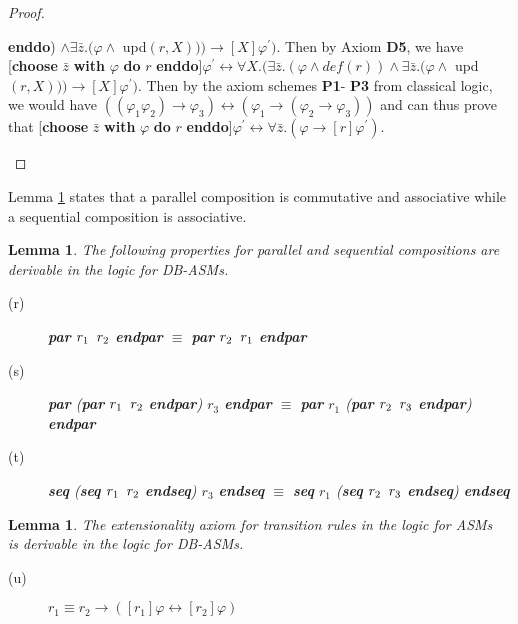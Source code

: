 \documentclass[preprint,11pt]{elsarticle}
\newtheorem{lemma}[theorem]{Lemma}
\theoremstyle{definition}
\theoremstyle{remark}
\begin{document}
\begin{proof}
\begin{itemize}
  \textbf{enddo}) $\wedge\exists \bar{z}.(\varphi\wedge$ upd$(r,X)))\rightarrow[X]\varphi^{\prime})$. Then by Axiom
  \textbf{D5}, we have [\textbf{choose} $\bar{z}$ \textbf{with} $\varphi$ \textbf{do} $r$
  \textbf{enddo}]$\varphi^{\prime}\leftrightarrow \forall X.(\exists \bar{z}.(\varphi\wedge def(r)) \wedge\exists \bar{z}.(\varphi\wedge$ upd$(r,X)))\rightarrow[X]\varphi^{\prime})$. Then by the axiom schemes \textbf{P1}- \textbf{P3} from classical logic, we would have $((\varphi_1\varphi_2)\rightarrow \varphi_3)\leftrightarrow (\varphi_1\rightarrow(\varphi_2\rightarrow\varphi_3))$ and can thus prove that [\textbf{choose} $\bar{z}$ \textbf{with} $\varphi$ \textbf{do} $r$
  \textbf{enddo}]$\varphi^{\prime}\leftrightarrow$$\forall \bar{z}. (\varphi\rightarrow [r]\varphi^{\prime})$.
\end{itemize}
\end{proof}
\fi
Lemma \ref{lem-soundness-composition} states that a parallel
composition is commutative and associative while a sequential
composition is associative.

\begin{lemma}\label{lem-soundness-composition}The following properties for parallel and sequential compositions are derivable in the logic for DB-ASMs.
\begin{description}
  \item[(r)] \textbf{par} $r_1\hspace{0.2cm} r_2$ \textbf{endpar} $\equiv$ \textbf{par} $r_2\hspace{0.2cm} r_1$ \textbf{endpar}\smallskip
  \item[(s)] \textbf{par} (\textbf{par} $r_1\hspace{0.2cm} r_2$ \textbf{endpar}) $r_3$ \textbf{endpar} $\equiv$ \textbf{par} $r_1$ (\textbf{par} $r_2\hspace{0.2cm} r_3$
  \textbf{endpar}) \textbf{endpar}\smallskip
  \item[(t)] \textbf{seq} (\textbf{seq} $r_1\hspace{0.2cm} r_2$ \textbf{endseq}) $r_3$ \textbf{endseq} $\equiv$ \textbf{seq} $r_1$ (\textbf{seq} $r_2\hspace{0.2cm} r_3$
  \textbf{endseq}) \textbf{endseq}\smallskip
\end{description}
\end{lemma}

\begin{lemma}The extensionality axiom for transition rules in the logic for ASMs~\cite{RobertLogicASM} is derivable in the logic for DB-ASMs.
\begin{description}

\item[(u)] $r_1\equiv r_2\rightarrow([r_1]\varphi\leftrightarrow [r_2]\varphi)$
\end{description}
\end{lemma}
\end{document}
